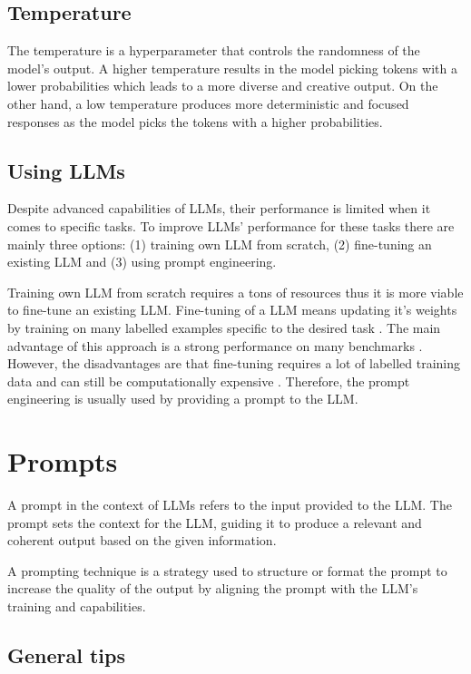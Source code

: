 \subsection{Temperature}
\label{temperature}
The temperature is a hyperparameter that controls the randomness of the model's output. A higher temperature results in the model picking tokens with a lower probabilities which leads to a more diverse and creative output. On the other hand, a low temperature produces more deterministic and focused responses as the model picks the tokens with a higher probabilities.


\subsection{Using LLMs}

Despite advanced capabilities of LLMs, their performance is limited when it comes to specific tasks. To improve LLMs' performance for these tasks there are mainly three options: (1) training own LLM from scratch, (2) fine-tuning an existing LLM and (3) using prompt engineering.

Training own LLM from scratch requires a tons of resources thus it is more viable to fine-tune an existing LLM. Fine-tuning of a LLM means updating it's weights by training on many labelled examples specific to the desired task \cite{Brown2020}. The main advantage of this approach is a strong performance on many benchmarks \cite{Brown2020}. However, the disadvantages are that fine-tuning requires a lot of labelled training data and can still be computationally expensive \cite{Brown2020}. Therefore, the prompt engineering is usually used by providing a prompt to the LLM.


\section{Prompts}

A prompt in the context of LLMs refers to the input provided to the LLM. The prompt sets the context for the LLM, guiding it to produce a relevant and coherent output based on the given information.

A prompting technique is a strategy used to structure or format the prompt to increase the quality of the output by aligning the prompt with the LLM's training and capabilities.


\subsection{General tips}
\label{prompt_general_tips}

